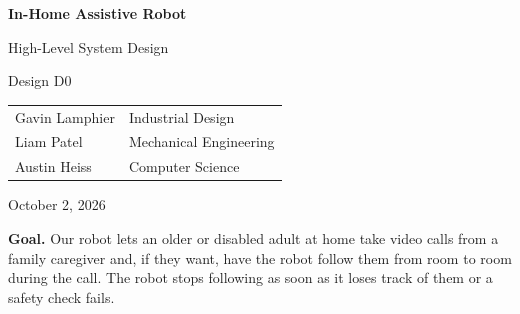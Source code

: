 \documentclass[12pt,letterpaper]{article}
\begin{document}
\begin{titlepage}

\centering

\vspace*{1.2in}

{\LARGE\bfseries In-Home Assistive Robot\par}

\vspace{0.25in}

{\Large High-Level System Design\par}

\vspace{0.12in}

{\large Design D0\par}

\vspace{0.8in}

\begin{tabular}{ll}

Gavin Lamphier & Industrial Design \\[6pt]

Liam Patel & Mechanical Engineering \\[6pt]

Austin Heiss & Computer Science \\[6pt]

\end{tabular}

\vspace{0.55in}

\par October 2, 2026

\vfill

\begin{minipage}{0.84\textwidth}

\textbf{Goal.} Our robot lets an older or disabled adult at home take video calls from a family caregiver and, if they want, have the robot follow them from room to room during the call. The robot stops following as soon as it loses track of them or a safety check fails.

\end{minipage}

\par\vspace{0.16in}{\small AI was used to format this document in \LaTeX.\par}

\vspace*{0.6in}

\end{titlepage}
\end{document}
